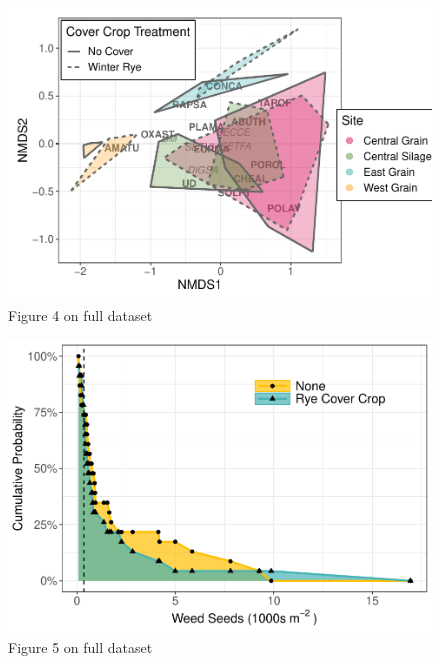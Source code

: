 \documentclass[]{article}
\begin{document}
\newpage

\begin{figure}
\centering
\includegraphics{supp-mat_files/figure-latex/unnamed-chunk-8-1.pdf}
\caption{Figure 4 on full dataset}
\end{figure}

\newpage

\begin{figure}
\centering
\includegraphics{supp-mat_files/figure-latex/unnamed-chunk-9-1.pdf}
\caption{Figure 5 on full dataset}
\end{figure}
\end{document}
